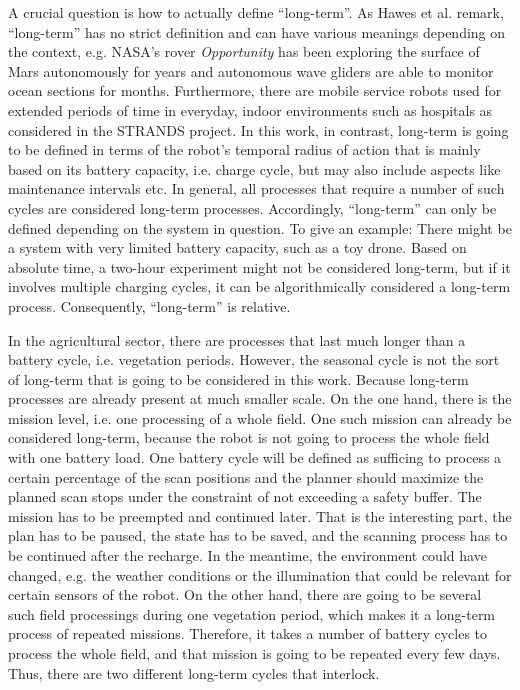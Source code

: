 \documentclass[german, master, expose, latin1]{base/thesis_KBS}
\begin{document}
A crucial question is how to actually define ``long-term''. As Hawes et al. remark, ``long-term'' has no strict definition and can have various meanings depending
on the context, e.g. NASA's rover \textit{Opportunity} has been exploring the surface of Mars autonomously for years and autonomous wave gliders are able to monitor
ocean sections for months. \cite{Hawes:2017} Furthermore, there are mobile service robots used for extended periods of time in everyday, indoor environments such as hospitals 
as considered in the STRANDS project.
In this work, in contrast, long-term is going to be defined in terms of the robot's temporal radius of action that is mainly based on its battery capacity, i.e. charge cycle,
but may also include aspects like maintenance intervals etc. In general, all processes that require a number of such cycles are considered long-term processes.
Accordingly, ``long-term'' can only be defined depending on the system in question. To give an example: There might be a system with very limited battery capacity, 
such as a toy drone. Based on absolute time, a two-hour experiment might not be considered long-term, but if it involves multiple charging cycles, it can be 
algorithmically considered a long-term process. Consequently, ``long-term'' is relative.\newline

In the agricultural sector, there are processes that last much longer than a battery cycle, i.e. vegetation periods.
However, the seasonal cycle is not the sort of long-term that is going to be considered in this work. Because long-term processes are already present at much smaller scale.
On the one hand, there is the mission level, i.e. one processing of a whole field. One such mission can already be considered long-term, because the robot is not 
going to process the whole field with one battery load. One battery cycle will be defined as sufficing to process a certain percentage of the scan positions and 
the planner should maximize the planned scan stops under the constraint of not exceeding a safety buffer.
The mission has to be preempted and continued later. That is the interesting part, the plan has to be paused,
the state has to be saved, and the scanning process has to be continued after the recharge. In the meantime, the environment could have changed, e.g. the weather conditions
or the illumination that could be relevant for certain sensors of the robot. On the other hand, there are going to be several such field processings during one vegetation
period, which makes it a long-term process of repeated missions. Therefore, it takes a number of battery cycles to process the whole field, and that mission is going to be
repeated every few days. Thus, there are two different long-term cycles that interlock.
\end{document}
